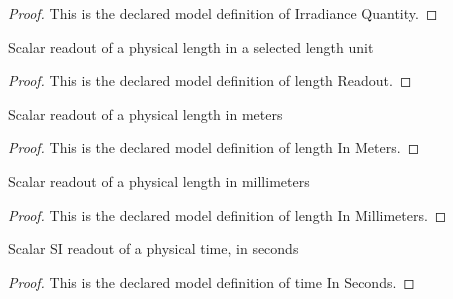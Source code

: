 \begin{proof}
  This is the declared model definition of Irradiance Quantity.
\end{proof}
\begin{definition}
  \label{def:physics:phyx-mini-0120:phyxminiproblems-problemphyxmini0120-lengthreadout}
  Scalar readout of a physical length in a selected length unit
\end{definition}
\begin{proof}
  This is the declared model definition of length Readout.
\end{proof}
\begin{definition}
  \label{def:physics:phyx-mini-0120:phyxminiproblems-problemphyxmini0120-lengthinmeters}
  Scalar readout of a physical length in meters
\end{definition}
\begin{proof}
  This is the declared model definition of length In Meters.
\end{proof}
\begin{definition}
  \label{def:physics:phyx-mini-0120:phyxminiproblems-problemphyxmini0120-lengthinmillimeters}
  Scalar readout of a physical length in millimeters
\end{definition}
\begin{proof}
  This is the declared model definition of length In Millimeters.
\end{proof}
\begin{definition}
  \label{def:physics:phyx-mini-0120:phyxminiproblems-problemphyxmini0120-timeinseconds}
  Scalar SI readout of a physical time, in seconds
\end{definition}
\begin{proof}
  This is the declared model definition of time In Seconds.
\end{proof}
